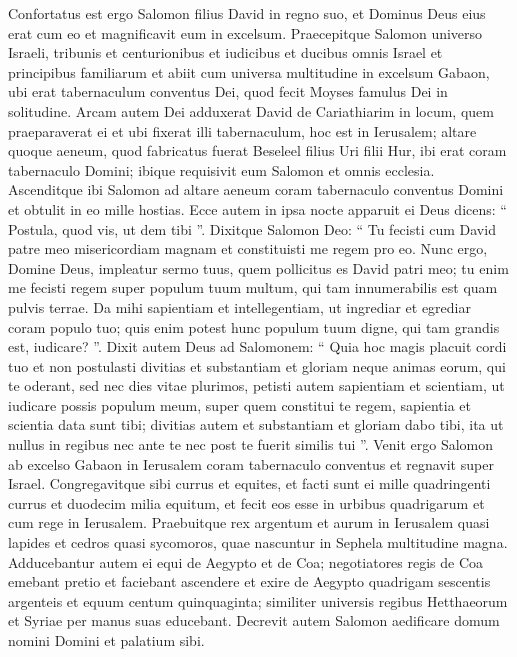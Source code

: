 \begin{biblechapter}
 \verse Confortatus est ergo Salomon filius David in regno suo, et Dominus Deus eius erat cum eo et magnificavit eum in excelsum. 
 \verse Praecepitque Salomon universo Israeli, tribunis et centurionibus et iudicibus et ducibus omnis Israel et principibus familiarum 
\verse et abiit cum universa multitudine in excelsum Gabaon, ubi erat tabernaculum conventus Dei, quod fecit Moyses famulus Dei in solitudine. 
\verse Arcam autem Dei adduxerat David de Cariathiarim in locum, quem praeparaverat ei et ubi fixerat illi tabernaculum, hoc est in Ierusalem; 
\verse altare quoque aeneum, quod fabricatus fuerat Beseleel filius Uri filii Hur, ibi erat coram tabernaculo Domini; ibique requisivit eum Salomon et omnis ecclesia. 
\verse Ascenditque ibi Salomon ad altare aeneum coram tabernaculo conventus Domini et obtulit in eo mille hostias.
 \verse Ecce autem in ipsa nocte apparuit ei Deus dicens: “ Postula, quod vis, ut dem tibi ”. 
\verse Dixitque Salomon Deo: “ Tu fecisti cum David patre meo misericordiam magnam et constituisti me regem pro eo. 
\verse Nunc ergo, Domine Deus, impleatur sermo tuus, quem pollicitus es David patri meo; tu enim me fecisti regem super populum tuum multum, qui tam innumerabilis est quam pulvis terrae. 
\verse Da mihi sapientiam et intellegentiam, ut ingrediar et egrediar coram populo tuo; quis enim potest hunc populum tuum digne, qui tam grandis est, iudicare? ”. 
\verse Dixit autem Deus ad Salomonem: “ Quia hoc magis placuit cordi tuo et non postulasti divitias et substantiam et gloriam neque animas eorum, qui te oderant, sed nec dies vitae plurimos, petisti autem sapientiam et scientiam, ut iudicare possis populum meum, super quem constitui te regem, 
 \verse sapientia et scientia data sunt tibi; divitias autem et substantiam et gloriam dabo tibi, ita ut nullus in regibus nec ante te nec post te fuerit similis tui ”. 
\verse Venit ergo Salomon ab excelso Gabaon in Ierusalem coram tabernaculo conventus et regnavit super Israel.
 \verse Congregavitque sibi currus et equites, et facti sunt ei mille quadringenti currus et duodecim milia equitum, et fecit eos esse in urbibus quadrigarum et cum rege in Ierusalem. 
\verse Praebuitque rex argentum et aurum in Ierusalem quasi lapides et cedros quasi sycomoros, quae nascuntur in Sephela multitudine magna. 
\verse Adducebantur autem ei equi de Aegypto et de Coa; negotiatores regis de Coa emebant pretio 
\verse et faciebant ascendere et exire de Aegypto quadrigam sescentis argenteis et equum centum quinquaginta; similiter universis regibus Hetthaeorum et Syriae per manus suas educebant. 
\verse Decrevit autem Salomon aedificare domum nomini Domini et palatium sibi.
 

\end{biblechapter}
